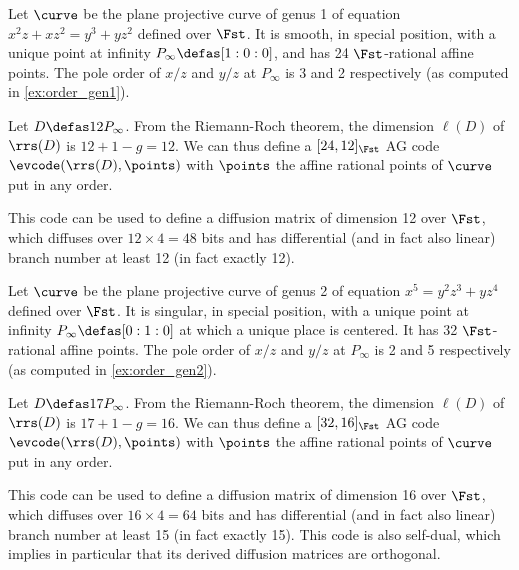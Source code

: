 \begin{example}
\label{ex:genus1}
Let $\curve$ be the plane projective curve of genus 1 of equation $x^2z + xz^2 = y^3 + yz^2$ defined over $\Fst$. It is smooth, in special position,
with a unique point at infinity $P_\infty \defas [1:0:0]$, and has 24 $\Fst$-rational affine points. The pole order
of $x/z$ and $y/z$ at $P_\infty$ is 3 and 2 respectively (as computed in \autoref{ex:order_gen1}).

Let $D \defas 12P_\infty$. From the Riemann-Roch theorem, the dimension $\ell(D)$ of $\rrs(D)$ is $12 + 1 - g = 12$. We can thus
define a $[24, 12]_{\Fst}$ AG code $\evcode(\rrs(D), \points)$ with $\points$ the affine rational points of $\curve$
put in any order.

This code can be used to define a diffusion matrix of dimension 12 over $\Fst$, which diffuses over $12\times 4 = 48$ bits and
has differential (and in fact also linear) branch number at least 12 (in fact exactly 12). 
\end{example}

\begin{example}
\label{ex:genus2}
Let $\curve$ be the plane projective curve of genus 2 of equation $x^5 = y^2z^3 + yz^4$ defined over $\Fst$. It is singular, in special position,
with a unique point at infinity $P_\infty \defas [0:1:0]$ at which a unique place is centered. It has 32 $\Fst$-rational affine points. The pole order
of $x/z$ and $y/z$ at $P_\infty$ is 2 and 5 respectively (as computed in \autoref{ex:order_gen2}).

Let $D \defas 17P_\infty$. From the Riemann-Roch theorem, the dimension $\ell(D)$ of $\rrs(D)$ is $17 + 1 - g = 16$. We can thus
define a $[32, 16]_{\Fst}$ AG code $\evcode(\rrs(D), \points)$ with $\points$ the affine rational points of $\curve$
put in any order.

This code can be used to define a diffusion matrix of dimension 16 over $\Fst$, which diffuses over $16\times 4 = 64$ bits and
has differential (and in fact also linear) branch number at least 15 (in fact exactly 15). This code is also self-dual,
which implies in particular that its derived diffusion matrices are orthogonal.
\end{example}
